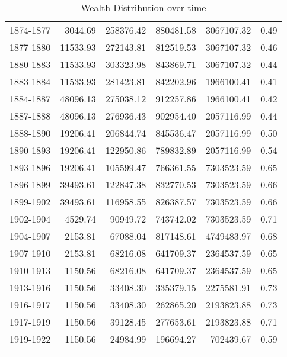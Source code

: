 \begin{table}[ht]
\begin{tabular}{lrrrrr}
  1874-1877 & 3044.69 & 258376.42 & 880481.58 & 3067107.32 & 0.49 \\ 
  1877-1880 & 11533.93 & 272143.81 & 812519.53 & 3067107.32 & 0.46 \\ 
  1880-1883 & 11533.93 & 303323.98 & 843869.71 & 3067107.32 & 0.44 \\ 
  1883-1884 & 11533.93 & 281423.81 & 842202.96 & 1966100.41 & 0.41 \\ 
  1884-1887 & 48096.13 & 275038.12 & 912257.86 & 1966100.41 & 0.42 \\ 
  1887-1888 & 48096.13 & 276936.43 & 902954.40 & 2057116.99 & 0.44 \\ 
  1888-1890 & 19206.41 & 206844.74 & 845536.47 & 2057116.99 & 0.50 \\ 
  1890-1893 & 19206.41 & 122950.86 & 789832.89 & 2057116.99 & 0.54 \\ 
  1893-1896 & 19206.41 & 105599.47 & 766361.55 & 7303523.59 & 0.65 \\ 
  1896-1899 & 39493.61 & 122847.38 & 832770.53 & 7303523.59 & 0.66 \\ 
  1899-1902 & 39493.61 & 116958.55 & 826387.57 & 7303523.59 & 0.66 \\ 
  1902-1904 & 4529.74 & 90949.72 & 743742.02 & 7303523.59 & 0.71 \\ 
  1904-1907 & 2153.81 & 67088.04 & 817148.61 & 4749483.97 & 0.68 \\ 
  1907-1910 & 2153.81 & 68216.08 & 641709.37 & 2364537.59 & 0.65 \\ 
  1910-1913 & 1150.56 & 68216.08 & 641709.37 & 2364537.59 & 0.65 \\ 
  1913-1916 & 1150.56 & 33408.30 & 335379.15 & 2275581.91 & 0.73 \\ 
  1916-1917 & 1150.56 & 33408.30 & 262865.20 & 2193823.88 & 0.73 \\ 
  1917-1919 & 1150.56 & 39128.45 & 277653.61 & 2193823.88 & 0.71 \\ 
  1919-1922 & 1150.56 & 24984.99 & 196694.27 & 702439.67 & 0.59 \\ 
   \hline
\multicolumn{6}{l}{}\\
\end{tabular}
\caption{Wealth Distribution over time} 
\label{tab:ginicoef}
\end{table}
